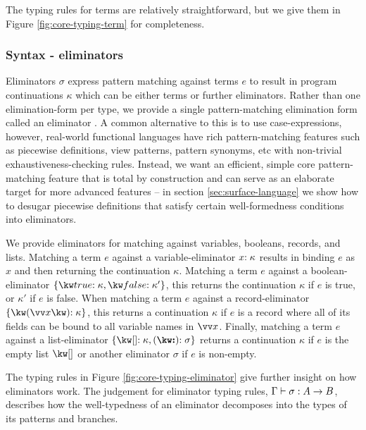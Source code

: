 The typing rules for terms are relatively straightforward, but we give them in Figure 
\ref{fig:core-typing-term} for completeness. 
  


\subsubsection{Syntax - eliminators}
\label{sssec:syntax-eliminator}
Eliminators $\sigma$ express pattern matching against terms $e$ to result in program continuations $\kappa$ which can be either terms or further eliminators. Rather than one elimination-form per type, we provide a single pattern-matching elimination form called an eliminator \cite{hinze00}. A common alternative to this is to use case-expressions, however, real-world functional languages have rich pattern-matching features such as piecewise definitions, view patterns, pattern synonyms, etc with non-trivial exhaustiveness-checking rules. Instead, we want an efficient, simple core pattern-matching feature that is total by construction and can serve as an elaborate target for more advanced features -- in section \ref{sec:surface-language} we show how to desugar piecewise definitions that satisfy certain well-formedness conditions into eliminators. 

We provide eliminators for matching against variables, booleans, records, and lists. Matching a term $e$ against a variable-eliminator ${x}{:}\;{\kappa}$ results in binding $e$ as $x$ and then returning the continuation $\kappa$. Matching a term $e$ against a boolean-eliminator $\elimBool{\kappa}{\kappa'}$, this returns the continuation $\kappa$ if $e$ is true, or $\kappa'$ if $e$ is false. When matching a term $e$ against a record-eliminator $\elimRec{\seq{x}}{\kappa}$, this returns a continuation $\kappa$ if $e$ is a record where all of its fields can be bound to all variable names in $\seq{x}$. Finally, matching a term $e$ against a list-eliminator $\elimList{\kappa}{\sigma}$ returns a continuation $\kappa$ if $e$ is the empty list $\exNil$ or another eliminator $\sigma$ if $e$ is non-empty.



The typing rules in Figure \ref{fig:core-typing-eliminator} give further insight on how eliminators work. The judgement for eliminator typing rules, $\Gamma \vdash \sigma: {A}\rightarrow{B}$, describes how the well-typedness of an eliminator decomposes into the types of its patterns and branches. 


